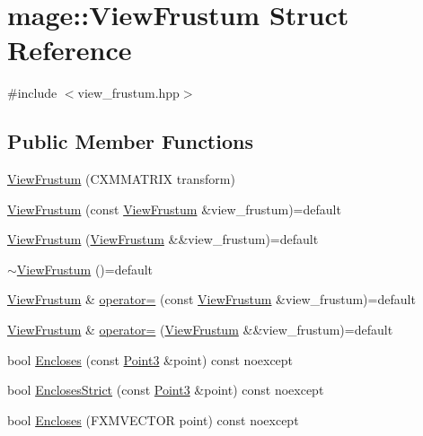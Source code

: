 \hypertarget{structmage_1_1_view_frustum}{}\section{mage\+:\+:View\+Frustum Struct Reference}
\label{structmage_1_1_view_frustum}


{\ttfamily \#include $<$view\+\_\+frustum.\+hpp$>$}

\subsection*{Public Member Functions}
\begin{DoxyCompactItemize}
\item 
\hyperlink{structmage_1_1_view_frustum_a907207904846729570c21919415ba7b2}{View\+Frustum} (C\+X\+M\+M\+A\+T\+R\+IX transform)
\item 
\hyperlink{structmage_1_1_view_frustum_abbd4ec6c2766d3f630bce16cefa8bc4d}{View\+Frustum} (const \hyperlink{structmage_1_1_view_frustum}{View\+Frustum} \&view\+\_\+frustum)=default
\item 
\hyperlink{structmage_1_1_view_frustum_a3568cfa6a5d440455867eb11b88a5213}{View\+Frustum} (\hyperlink{structmage_1_1_view_frustum}{View\+Frustum} \&\&view\+\_\+frustum)=default
\item 
\hyperlink{structmage_1_1_view_frustum_aaa0e10f5401370909694e923c58323a9}{$\sim$\+View\+Frustum} ()=default
\item 
\hyperlink{structmage_1_1_view_frustum}{View\+Frustum} \& \hyperlink{structmage_1_1_view_frustum_add514821f691117c0ab139c13f86ef70}{operator=} (const \hyperlink{structmage_1_1_view_frustum}{View\+Frustum} \&view\+\_\+frustum)=default
\item 
\hyperlink{structmage_1_1_view_frustum}{View\+Frustum} \& \hyperlink{structmage_1_1_view_frustum_a0167f34c3ba505155ed6064c6d98a99c}{operator=} (\hyperlink{structmage_1_1_view_frustum}{View\+Frustum} \&\&view\+\_\+frustum)=default
\item 
bool \hyperlink{structmage_1_1_view_frustum_a68e7b7915505d42de255ffb37b4beba3}{Encloses} (const \hyperlink{structmage_1_1_point3}{Point3} \&point) const noexcept
\item 
bool \hyperlink{structmage_1_1_view_frustum_ab0df90a890172361fb520d4527d81546}{Encloses\+Strict} (const \hyperlink{structmage_1_1_point3}{Point3} \&point) const noexcept
\item 
bool \hyperlink{structmage_1_1_view_frustum_aba92d74f79b16d7ae656b2f271202d12}{Encloses} (F\+X\+M\+V\+E\+C\+T\+OR point) const noexcept

\end{DoxyCompactItemize}
